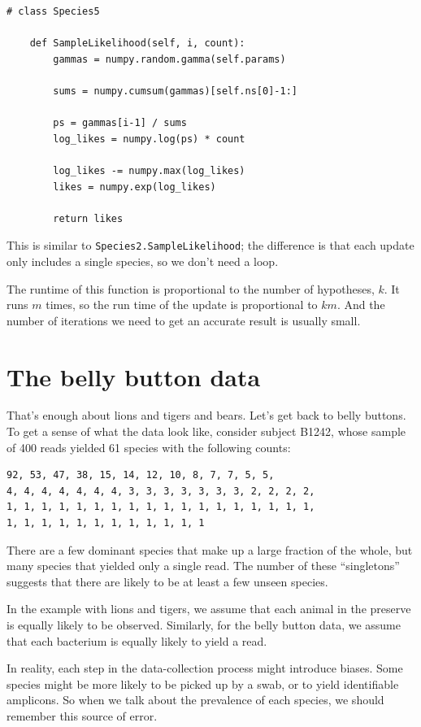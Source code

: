 \documentclass[12pt]{book}
\begin{document}
\begin{verbatim}
# class Species5

    def SampleLikelihood(self, i, count):
        gammas = numpy.random.gamma(self.params)

        sums = numpy.cumsum(gammas)[self.ns[0]-1:]

        ps = gammas[i-1] / sums
        log_likes = numpy.log(ps) * count

        log_likes -= numpy.max(log_likes)
        likes = numpy.exp(log_likes)

        return likes
\end{verbatim}

This is similar to {\tt Species2.SampleLikelihood}; the
difference is that each update only includes a single species,
so we don't need a loop.

The runtime of this function is proportional to the number
of hypotheses, $k$.  It runs $m$ times, so the run time of
the update is proportional to $k m$.
And the number of iterations we
need to get an accurate result is usually small.


\section{The belly button data}
\label{belly}

That's enough about lions and tigers and bears.
Let's get back to belly buttons.  To get a sense of what the
data look like, consider subject B1242,
whose sample of 400 reads yielded 61 species with the following
counts:

\begin{verbatim}
92, 53, 47, 38, 15, 14, 12, 10, 8, 7, 7, 5, 5, 
4, 4, 4, 4, 4, 4, 4, 3, 3, 3, 3, 3, 3, 3, 2, 2, 2, 2,
1, 1, 1, 1, 1, 1, 1, 1, 1, 1, 1, 1, 1, 1, 1, 1, 1, 1,
1, 1, 1, 1, 1, 1, 1, 1, 1, 1, 1, 1
\end{verbatim}

There are a few dominant species that make up a large
fraction of the whole, but many species that yielded only
a single read.  The number of these ``singletons'' suggests
that there are likely to be at least a few unseen species.

In the example with lions and tigers, we assume that each
animal in the preserve is equally likely to be observed.
Similarly, for the belly button data, we assume that each
bacterium is equally likely to yield a read.

In reality, each step in the data-collection
process might introduce biases.  Some species might
be more likely to be picked up by a swab, or to yield identifiable
amplicons.  So when we talk about the prevalence of each species,
we should remember this source of error.
\end{document}
